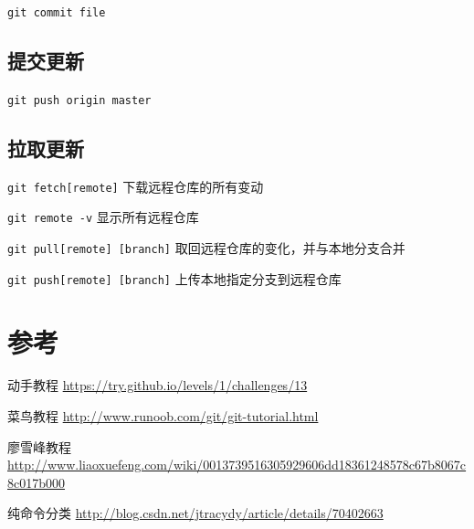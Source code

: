 \documentclass[UTF8,a4paper,12pt]{ctexbook}
\begin{document}
			   \verb|git commit file|
	  
	  \section{提交更新}
		  \verb|git push origin master|
		  
	  \section{拉取更新}
		  
		  \verb|git fetch[remote]| 下载远程仓库的所有变动
		  
		  \verb|git remote -v| 显示所有远程仓库
		  
		  \verb|git pull[remote] [branch]| 取回远程仓库的变化，并与本地分支合并

		  \verb|git push[remote] [branch]| 上传本地指定分支到远程仓库
  
  \chapter{参考}
		  动手教程   \url{https://try.github.io/levels/1/challenges/13}
		  
		  菜鸟教程   \url{http://www.runoob.com/git/git-tutorial.html}
		  
		  廖雪峰教程 \url{http://www.liaoxuefeng.com/wiki/0013739516305929606dd18361248578c67b8067c8c017b000}
		  
		  纯命令分类 \url{http://blog.csdn.net/jtracydy/article/details/70402663}
\end{document}
